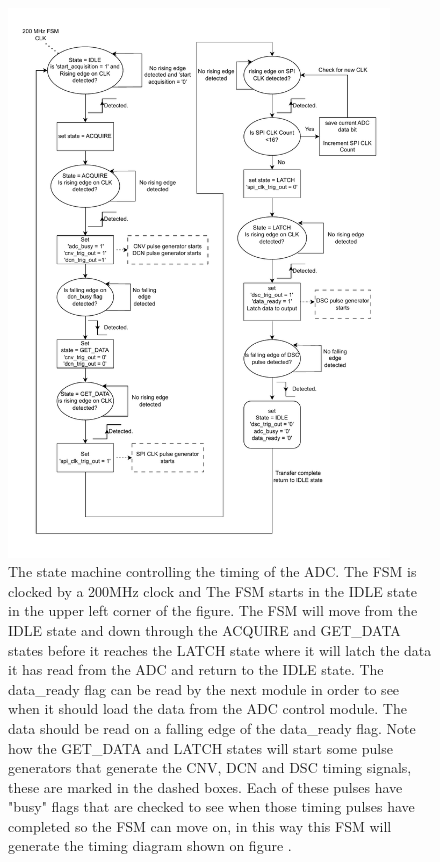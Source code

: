 \begin{figure}[H]
    \centering
    \includegraphics[clip, trim=0 0 0 0, width=0.9\textwidth]{Sections/7_SystemDesign/Figures/7_2_8_ADC Control Logic FSM.pdf}
    \caption{The state machine controlling the timing of the ADC. The FSM is clocked by a 200MHz clock and The FSM starts in the IDLE state in the upper left corner of the figure. The FSM will move from the IDLE state and down through the ACQUIRE and GET\_DATA states before it reaches the LATCH state where it will latch the data it has read from the ADC and return to the IDLE state. The data\_ready flag can be read by the next module in order to see when it should load the data from the ADC control module. The data should be read on a falling edge of the data\_ready flag. Note how the GET\_DATA and LATCH states will start some pulse generators that generate the CNV, DCN and DSC timing signals, these are marked in the dashed boxes. Each of these pulses have "busy" flags that are checked to see when those timing pulses have completed so the FSM can move on, in this way this FSM will generate the timing diagram shown on figure .}
    \label{fig:7_2_8_ADC_CONTROL_FSM}
\end{figure}

